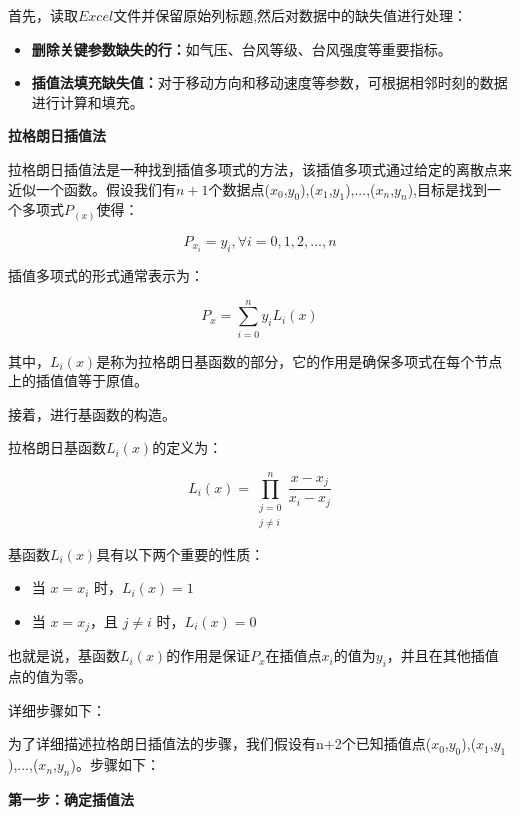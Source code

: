\documentclass[withoutpreface,bwprint]{cumcmthesis}
\begin{document}
首先，读取\(Excel\)文件并保留原始列标题,然后对数据中的缺失值进行处理：

\setlength{\leftskip}{4em}  %

\begin{itemize}
    \item \textbf{删除关键参数缺失的行：}如气压、台风等级、台风强度等重要指标。

    \item \textbf{插值法填充缺失值：}对于移动方向和移动速度等参数，可根据相邻时刻的数据进行计算和填充。
\end{itemize}

\setlength{\leftskip}{0em}  %

\textbf{拉格朗日插值法}

拉格朗日插值法是一种找到插值多项式的方法，该插值多项式通过给定的离散点来近似一个函数。假设我们有\(n+1\)个数据点($x_{0}$,$y_{0}$),($x_{1}$,$y_{1}$),...,($x_{n}$,$y_{n}$),目标是找到一个多项式$P_{(x)}$使得：

\[P_{x_{i}} = y_{i},\forall i = 0,1,2,...,n \]

插值多项式的形式通常表示为：

\[P_{x}=\sum_{i=0}^{n} y_{i}L_{i}(x)\]

其中，$L_{i}(x)$是称为拉格朗日基函数的部分，它的作用是确保多项式在每个节点上的插值值等于原值。

接着，进行基函数的构造。

拉格朗日基函数$L_{i}(x)$的定义为：

\[L_i(x) = \prod_{\substack{j=0 \\ j \neq i}}^n \frac{x - x_j}{x_i - x_j}\]

基函数$L_{i}(x)$具有以下两个重要的性质：

\begin{itemize}
  \setlength{\itemindent}{2em}
  \item 当 \( x = x_{i} \) 时，\( L_{i}(x) = 1 \)
  \item 当 \( x = x_{j} \)，且 \( j \ne i \) 时，\( L_{i}(x) = 0 \)
\end{itemize}


也就是说，基函数$L_{i}(x)$的作用是保证$P_{x}$在插值点$x_{i}$的值为$y_{i}$，并且在其他插值点的值为零。

详细步骤如下：

为了详细描述拉格朗日插值法的步骤，我们假设有n+2个已知插值点($x_{0}$,$y_{0}$),($x_{1}$,$y_{1}$),...,($x_{n}$,$y_{n}$)。步骤如下：

\vspace{1em}
\textbf{第一步：确定插值法}
\end{document}
